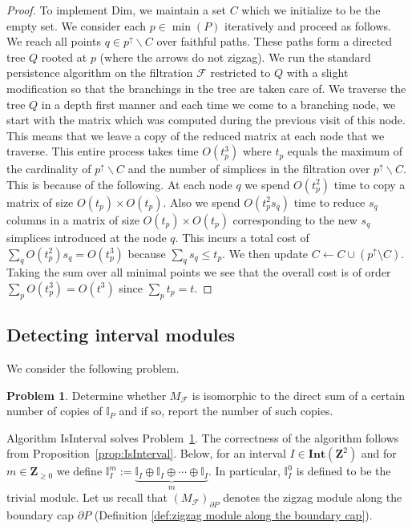 \documentclass[11pt]{article}
\theoremstyle{definition}
\newtheorem{problem}[theorem]{Problem}
\newcommand{\Zplus}{\mathbf{Z}_{\geq 0}}
\newcommand{\Int}{\mathbf{Int}}
\newcommand{\I}{\mathbb{I}}
\newcommand{\Pb}{P}
\newcommand{\NN}{t}
\newcommand{\Z}{\mathbf{Z}}
\begin{document}
\begin{proof}
To implement {\sc Dim},  
we maintain a set $C$ which we initialize to be the empty set. 
We consider each $p\in \min(\Pb)$ iteratively and proceed as follows. We 
reach all points $q\in p^{\uparrow}\backslash C$ over faithful paths. 
These paths form a directed tree $Q$ rooted at $p$  (where the arrows do not zigzag). We  run the standard persistence algorithm on the filtration $\mathcal F$ restricted
to $Q$ with 
a slight modification so that
the branchings in the tree are taken care of.  We traverse the tree $Q$ in a depth first manner and each time we come to a branching node, we start with the matrix which was computed during the previous visit of this node. This means that we leave a copy of the reduced matrix at each node that we traverse. 
This entire process takes time $O(\NN_p^3)$ where $\NN_p$ equals the maximum of the cardinality of $p^\uparrow\backslash C$ and the number of simplices
in the filtration over $p^\uparrow\backslash C$. This is because of the following.
At each node $q$ we spend $O(\NN_p^2)$ time to copy
a matrix of size $O(\NN_p)\times O(\NN_p)$. Also we spend $O(t_p^2s_q)$ time to
reduce $s_q$ columns in a matrix of size $O(\NN_p)\times O(\NN_p)$ corresponding to the new $s_q$ simplices introduced at the node $q$. This incurs a total cost of $\sum_q O(t_p^2)s_q=O(t_p^3)$ because $\sum_q s_q\leq  t_p$. We then update $C \leftarrow  C\cup (p^\uparrow\setminus C)$.
Taking the sum over all minimal points we see that the overall cost is of order $\sum_{p} O(\NN_p^3)=O(\NN^3)$ since $\sum_p \NN_p=\NN$. 
\end{proof}



\subsection{Detecting interval modules}
We consider the following problem. 
\begin{problem}\label{prob:isinterval}
Determine whether $M_{\mathcal{F}}$ is isomorphic to the direct sum of a certain number of copies of $\I_\Pb$ and if so, report the number of such copies.
\end{problem}

Algorithm {\sc IsInterval} solves Problem~\ref{prob:isinterval}.
 The correctness of the algorithm follows from Proposition~\ref{prop:IsInterval}. Below, for an interval
$I\in \Int(\Z^2)$ and for $m\in \Zplus$ we define $\I_I^{m}:=\underbrace{\I_I\oplus\I_I\oplus\cdots \oplus \I_I}_{m}$. In particular, $\I_I^0$ is defined to be the trivial module. Let us recall that $(M_{\mathcal F})_{\partial \Pb}$ denotes the zigzag module along the boundary cap $\partial \Pb$ (Definition \ref{def:zigzag module along the boundary cap}).\\
\end{document}
